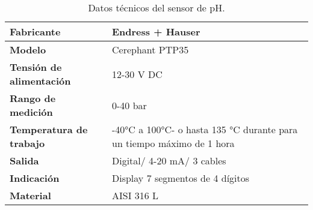 \renewcommand{\arraystretch}{2}
\begin{table}[H]
    \centering
    \caption{Datos técnicos del sensor de pH.}
    \label{table:sensor_presion}
    \begin{tabular}{| L{5cm} | L{5cm} |}
        \hline
        \textbf{Fabricante} & Endress + Hauser  \\
        \hline
        \textbf{Modelo} & Cerephant PTP35  \\
        \hline
        \textbf{Tensión de alimentación} & 12-30 V DC  \\
        \hline
        \textbf{Rango de medición} & 0-40 bar  \\
        \hline
        \textbf{Temperatura de trabajo} & -40°C a 100°C- o hasta 135 °C durante para un tiempo máximo de 1 hora  \\
        \hline
        \textbf{Salida} & Digital/ 4-20 mA/ 3 cables  \\
        \hline
        \textbf{Indicación} & Display 7 segmentos de 4 dígitos  \\
        \hline
        \textbf{Material} & AISI 316 L  \\
        \hline
  
    \end{tabular}
\end{table}

